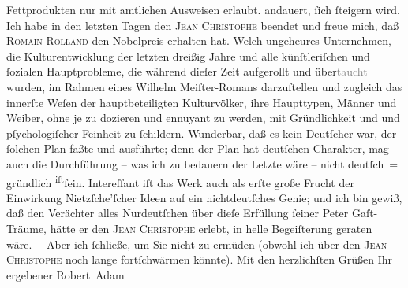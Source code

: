 \begin{ledgroupsized}[t]{13cm}
{{{                  Fettprodukten nur mit amtlichen Ausweisen erlaubt.}}}\label{K_L02246_1h} andauert, {\pb}ſich ſteigern wird.\pend
           \pstart
           Ich habe in den letzten Tagen den \textsc{Jean Christophe} beendet und freue mich, daß \textsc{Romain Rolland} den Nobelpreis erhalten hat. Welch
               ungeheures Unternehmen, die Kulturentwicklung der letzten dreißig Jahre und alle
               künſtleriſchen und ſozialen Hauptprobleme, die während dieſer Zeit aufgerollt und
                  über\textcolor{gray}{taucht} wurden, im Rahmen eines Wilhelm Meiſter-Romans darzuſtellen und zugleich das innerſte
               Weſen der hauptbeteiligten Kulturvölker, ihre Haupttypen, Männer und Weiber, ohne je
               zu dozieren und ennuyant zu werden, mit Gründlichkeit und und pſychologiſcher
               Feinheit  zu ſchildern. Wunderbar, daß es kein
               Deutſcher war, der ſolchen Plan faßte und ausführte; denn der Plan hat deutſchen
               Charakter, mag auch die Durchführung – was ich zu bedauern {\pb}der Letzte wäre – nicht deutſch = gründlich \substVorne{}\textsuperscript{iſt}\substDazwischen{}ſein\substHinten{}. Intereſſant iſt das Werk auch als erſte große Frucht der Einwirkung Nietzſche’ſcher Ideen auf ein nichtdeutſches
               Genie; und ich bin gewiß, daß den Verächter alles Nurdeutſchen über dieſe Erfüllung
               ſeiner Peter Gaſt-Träume, hätte er den \textsc{Jean Christophe} erlebt, in helle Begeiſterung geraten wäre. –\pend
           \pstart
           Aber ich ſchließe, um Sie nicht zu ermüden (obwohl ich über den \textsc{Jean Christophe} noch lange fortſchwärmen könnte).\pend
           \pstart
           Mit den herzlichſten Grüßen Ihr ergebener\pend
           \pstart \spacefill\mbox{Robert Adam}\pend{}
         
         \endnumbering{}\end{ledgroupsized}  \newcommand{\dateiname}{L02246}\newcommand{\titel}{Robert Adam an Arthur Schnitzler, 20. 11. 1916}\newcommand{\editorInnen}{Martin Anton Müller und Gerd-Hermann Susen}
      